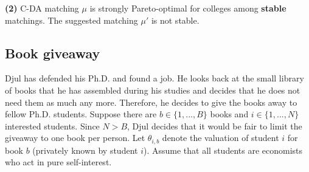 \documentclass[a4paper]{article}
\begin{document}
	\textbf{(2)} %
	C-DA matching $\mu$ is strongly Pareto-optimal for colleges among \textbf{stable} matchings. The suggested matching $\mu'$ is not stable.
\fi



\subsection{Book giveaway}
Djul has defended his Ph.D. and found a job. He looks back at the small library of books that he has assembled during his studies and decides that he does not need them as much any more. Therefore, he decides to give the books away to fellow Ph.D. students. Suppose there are $b \in \{1,...,B\}$ books and $i \in \{1,...,N\}$ interested students. Since $N > B$, Djul decides that it would be fair to limit the giveaway to one book per person. Let $\theta_{i,b}$ denote the valuation of student $i$ for book $b$ (privately known by student $i$). Assume that all students are economists who act in pure self-interest.
\end{document}
